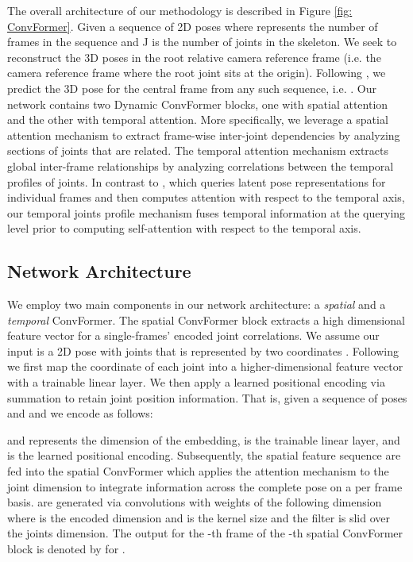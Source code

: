 \documentclass{article}
\begin{document}
The overall architecture of our methodology is described in Figure \ref{fig: ConvFormer}. Given a sequence of 2D poses  where  represents the number of frames in the sequence and J is the number of joints in the skeleton. We seek to reconstruct the 3D poses in the root relative camera reference frame (i.e. the camera reference frame where the root joint sits at the origin). Following \cite{PFGA19}, we predict the 3D pose for the central frame from any such sequence, i.e. . Our network contains two Dynamic ConvFormer blocks, one with spatial attention and the other with temporal attention. More specifically, we leverage a spatial attention mechanism to extract frame-wise inter-joint dependencies by analyzing sections of joints that are related. The temporal attention mechanism extracts global inter-frame relationships by analyzing correlations between the temporal profiles of joints. In contrast to \cite{ZZMYCD21}, which queries latent pose representations for individual frames and then computes attention with respect to the temporal axis, our temporal joints profile mechanism fuses temporal information at the querying level prior to computing self-attention with respect to the temporal axis.


\subsection{Network Architecture}
We employ two main components in our network architecture: a \textit{spatial} and a \textit{temporal} ConvFormer. The spatial ConvFormer block extracts a high dimensional feature vector for a single-frames' encoded joint correlations. We assume our input is a 2D pose with  joints that is represented by two coordinates . Following \cite{ZZMYCD21} we first map the coordinate of each joint into a higher-dimensional feature vector with a trainable linear layer. We then apply a learned positional encoding via summation to retain joint position information. That is, given a sequence of poses  and  and  we encode  as follows:

and  represents the dimension of the embedding,  is the trainable linear layer, and  is the learned positional encoding. Subsequently, the spatial feature sequence  are fed into the spatial ConvFormer which applies the attention mechanism to the joint dimension to integrate information across the complete pose on a per frame basis.  are generated via convolutions with weights of the following dimension  where  is the encoded dimension and  is the kernel size and the filter is slid over the joints dimension. The output for the -th frame of the -th spatial ConvFormer block is denoted by  for .
\end{document}
